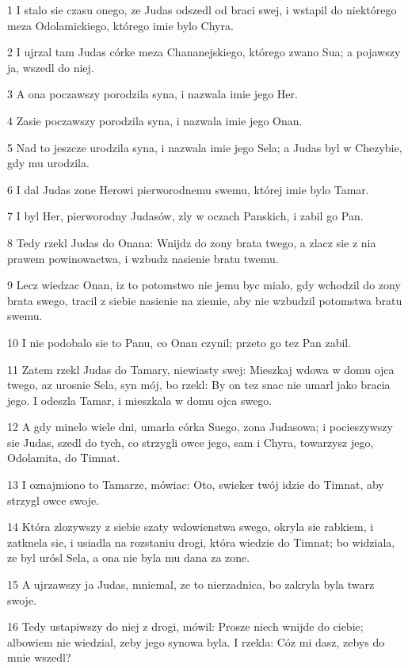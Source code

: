 \par 1 I stalo sie czasu onego, ze Judas odszedl od braci swej, i wstapil do niektórego meza Odolamickiego, którego imie bylo Chyra.
\par 2 I ujrzal tam Judas córke meza Chananejskiego, którego zwano Sua; a pojawszy ja, wszedl do niej.
\par 3 A ona poczawszy porodzila syna, i nazwala imie jego Her.
\par 4 Zasie poczawszy porodzila syna, i nazwala imie jego Onan.
\par 5 Nad to jeszcze urodzila syna, i nazwala imie jego Sela; a Judas byl w Chezybie, gdy mu urodzila.
\par 6 I dal Judas zone Herowi pierworodnemu swemu, której imie bylo Tamar.
\par 7 I byl Her, pierworodny Judasów, zly w oczach Panskich, i zabil go Pan.
\par 8 Tedy rzekl Judas do Onana: Wnijdz do zony brata twego, a zlacz sie z nia prawem powinowactwa, i wzbudz nasienie bratu twemu.
\par 9 Lecz wiedzac Onan, iz to potomstwo nie jemu byc mialo, gdy wchodzil do zony brata swego, tracil z siebie nasienie na ziemie, aby nie wzbudzil potomstwa bratu swemu.
\par 10 I nie podobalo sie to Panu, co Onan czynil; przeto go tez Pan zabil.
\par 11 Zatem rzekl Judas do Tamary, niewiasty swej: Mieszkaj wdowa w domu ojca twego, az urosnie Sela, syn mój, bo rzekl: By on tez snac nie umarl jako bracia jego. I odeszla Tamar, i mieszkala w domu ojca swego.
\par 12 A gdy minelo wiele dni, umarla córka Suego, zona Judasowa; i pocieszywszy sie Judas, szedl do tych, co strzygli owce jego, sam i Chyra, towarzysz jego, Odolamita, do Timnat.
\par 13 I oznajmiono to Tamarze, mówiac: Oto, swieker twój idzie do Timnat, aby strzygl owce swoje.
\par 14 Która zlozywszy z siebie szaty wdowienstwa swego, okryla sie rabkiem, i zatknela sie, i usiadla na rozstaniu drogi, która wiedzie do Timnat; bo widziala, ze byl urósl Sela, a ona nie byla mu dana za zone.
\par 15 A ujrzawszy ja Judas, mniemal, ze to nierzadnica, bo zakryla byla twarz swoje.
\par 16 Tedy ustapiwszy do niej z drogi, mówil: Prosze niech wnijde do ciebie; albowiem nie wiedzial, zeby jego synowa byla. I rzekla: Cóz mi dasz, zebys do mnie wszedl?

